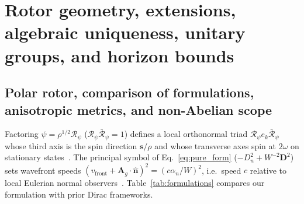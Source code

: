 \documentclass[aps,prd,onecolumn,tightenlines,nofootinbib,notitlepage,10pt,floatfix]{revtex4-2}
\theoremstyle{indentedtheorem}
\begin{document}
\section{Rotor geometry, extensions, algebraic uniqueness, unitary groups, and horizon bounds}
\label{sec:geometry_extensions}

\subsection{Polar rotor, comparison of formulations, anisotropic metrics, and non-Abelian scope}
\label{sec:extensions}

Factoring $\psi=\rho^{1/2}\mathcal{R}_\psi$ ($\mathcal{R}_\psi\bar{\mathcal{R}}_\psi=1$) defines a local orthonormal triad $\mathcal{R}_\psi e_k\bar{\mathcal{R}}_\psi$ whose third axis is the spin direction $\mathbf{s}/\rho$ and whose transverse axes spin at $2\omega$ on stationary states~\citep{Hestenes1967Real,Hestenes1990Zitterbewegung}. The principal symbol of Eq.~\eqref{eq:pure_form} ($-D_n^2+W^{-2}\mathbf{D}^2$) sets wavefront speeds $(v_\text{front}+\mathbf{A}_g\cdot\hat{\mathbf{n}})^2=(c\alpha_n/W)^2$, i.e.\ speed $c$ relative to local Eulerian normal observers~\citep{Thaller1992Dirac}. Table~\ref{tab:formulations} compares our formulation with prior Dirac frameworks.
\end{document}
